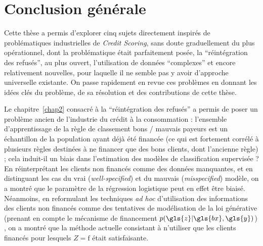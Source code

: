 
\section{Conclusion générale}

Cette thèse a permis d'explorer cinq sujets directement inspirés de problématiques industrielles de \textit{Credit Scoring}, sans doute graduellement du plus opérationnel, dont la problématique était parfaitement posée, la ``réintégration des refusés'', au plus ouvert, l'utilisation de données ``complexes'' et encore relativement nouvelles, pour laquelle il ne semble pas y avoir d'approche universelle existante. On passe rapidement en revue ces problèmes en donnant les idées clés du problème, de sa résolution et des contributions de cette thèse.

\medskip

Le chapitre~\ref{chap2} consacré à la ``réintégration des refusés'' a permis de poser un problème ancien de l'industrie du crédit à la consommation : l'ensemble d'apprentissage de la règle de classement bons / mauvais payeurs est un échantillon de la population ayant déjà été financée (ce qui est fortement corrélé à plusieurs règles destinées à ne financer que des bons clients, dont l'ancienne règle) ; cela induit-il un biais dans l'estimation des modèles de classification supervisée ? En réinterprétant les clients non financés comme des données manquantes, et en distinguant les cas du vrai (\textit{well-specified}) et du mauvais (\textit{misspecified}) modèle, on a montré que le paramètre de la régression logistique peut en effet être biaisé. Néanmoins, en reformulant les techniques \textit{ad hoc} d'utilisation des informations des clients non financés comme des tentatives de modélisation de la loi générative (prenant en compte le mécanisme de financement $p(\gls{z} | \gls{bx},\gls{y})$)
, on a montré que la méthode actuelle consistant à n'utiliser que les clients financés pour lesquels $Z = \text{f}$ était satisfaisante.

\medskip

